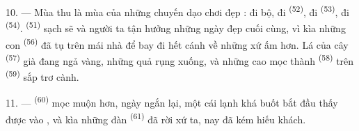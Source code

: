 10. --- Mùa thu là mùa của những chuyến dạo chơi đẹp : đi bộ, đi 
\textsuperscript{(52)}, đi  \textsuperscript{(53)}, đi 
\textsuperscript{(54)}.  \textsuperscript{(51)} sạch sẽ và người ta tận
hưởng những ngày đẹp cuối cùng, vì kìa những con 
\textsuperscript{(56)} đã tụ trên mái nhà để bay đi hết cánh về những xứ ấm hơn. Lá của
cây  \textsuperscript{(57)} già đang ngả vàng, những quả 
rụng xuống, và những  cao mọc thành  \textsuperscript{(58)} trên
 \textsuperscript{(59)} sắp trơ cành.

11. ---  \textsuperscript{(60)} mọc muộn hơn, ngày ngắn lại, một cái
lạnh khá buốt bắt đầu thấy được vào , và kìa những đàn 
\textsuperscript{(61)} đã rời xứ ta, nay đã kém hiếu khách.
\VUsaut{6.0mm}
\VUfilet{22mm}
